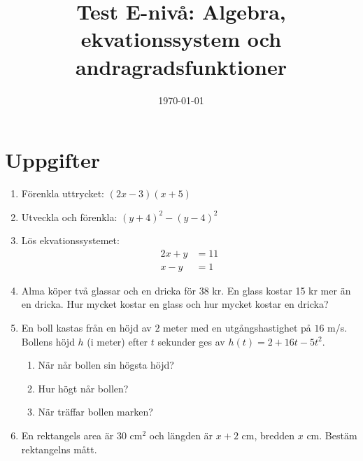 \documentclass[a4paper,11pt]{article}
\title{Test E-nivå: Algebra, ekvationssystem och andragradsfunktioner}
\author{}
\date{\today}
\begin{document}
\maketitle

\section*{Uppgifter}
\begin{enumerate}[label=\textbf{\arabic*.}]
    \item Förenkla uttrycket: $(2x - 3)(x + 5)$

    \item Utveckla och förenkla: $(y + 4)^2 - (y - 4)^2$

    \item Lös ekvationssystemet:
    \begin{align*}
    2x + y &= 11 \\
    x - y &= 1
    \end{align*}

    \item Alma köper två glassar och en dricka för 38 kr. En glass kostar 15 kr mer än en dricka. Hur mycket kostar en glass och hur mycket kostar en dricka?

    \item En boll kastas från en höjd av $2$ meter med en utgångshastighet på $16$ m/s. Bollens höjd $h$ (i meter) efter $t$ sekunder ges av $h(t) = 2 + 16t - 5t^2$.
    \begin{enumerate}[label=\alph*)]
        \item När når bollen sin högsta höjd?
        \item Hur högt når bollen?
        \item När träffar bollen marken?
    \end{enumerate}

    \item En rektangels area är $30$ cm$^2$ och längden är $x+2$ cm, bredden $x$ cm. Bestäm rektangelns mått.

\end{enumerate}

\newpage
\end{document}
